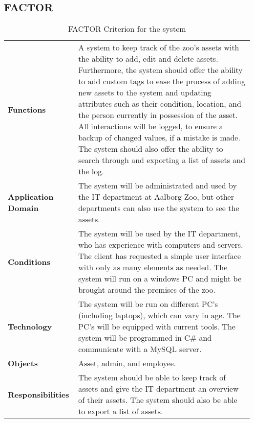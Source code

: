 \subsection*{FACTOR} \label{sec:factor}
\par
\begin{table}[H]
    \centering
    {
    \renewcommand{\arraystretch}{2.0}
    \begin{tabular}{ m{4cm} m{10cm} }
        \hline
        
        \textbf{Functions} & A system to keep track of the zoo's assets with the ability to add, edit and delete assets. Furthermore, the system should offer the ability to add custom tags to ease the process of adding new assets to the system and updating attributes such as their condition, location, and the person currently in possession of the asset. All interactions will be logged, to ensure a backup of changed values, if a mistake is made. The system should also offer the ability to search through and exporting a list of assets and the log.\\
        
        \textbf{Application Domain} & The system will be administrated and used by the IT department at Aalborg Zoo, but other departments can also use the system to see the assets.\\
        
        \textbf{Conditions} & The system will be used by the IT department, who has experience with computers and servers. The client has requested a simple user interface with only as many elements as needed. The system will run on a windows PC and might be brought around the premises of the zoo.\\
        
        \textbf{Technology} & The system will be run on different PC's (including laptops), which can vary in age. The PC's will be equipped with current tools. The system will be programmed in C\# and communicate with a MySQL server.\\
        
        \textbf{Objects} & Asset, admin, and employee.\\
        
        \textbf{Responsibilities} & The system should be able to keep track of assets and give the IT-department an overview of their assets. The system should also be able to export a list of assets.\\
        
        \hline
    \end{tabular}
    \caption{FACTOR Criterion for the system}
    \label{tab:factor}
    }
\end{table}